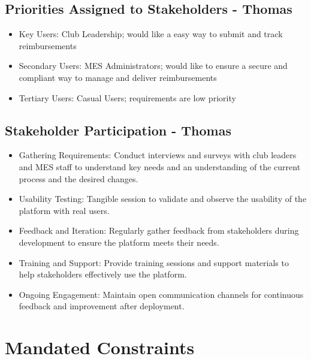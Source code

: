 \documentclass[12pt]{article}
\begin{document}
  \subsection{Priorities Assigned to Stakeholders - Thomas}
    \begin{itemize}
      \item Key Users: Club Leadership; would like a easy way to submit and track reimbursements
      \item Secondary Users: MES Administrators; would like to ensure a secure and compliant way to manage and deliver reimbursements
      \item Tertiary Users: Casual Users; requirements are low priority
    \end{itemize}
  \subsection{Stakeholder Participation - Thomas}
    \begin{itemize}
      \item Gathering Requirements: Conduct interviews and surveys with club leaders and MES staff to understand key needs and an understanding of the current process and the desired changes.
      \item Usability Testing: Tangible session to validate and observe the usability of the platform with real users. 
      \item Feedback and Iteration: Regularly gather feedback from stakeholders during development to ensure the platform meets their needs.
      \item Training and Support: Provide training sessions and support materials to help stakeholders effectively use the platform.
      \item Ongoing Engagement: Maintain open communication channels for continuous feedback and improvement after deployment.
    \end{itemize}


\section{Mandated Constraints}
\end{document}
